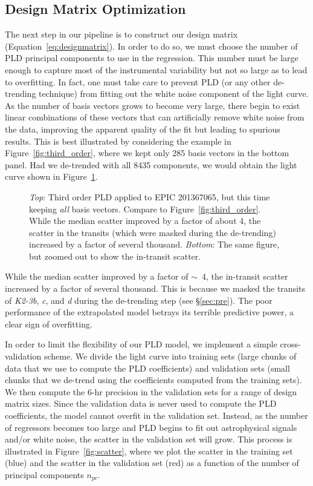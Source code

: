 \documentclass[]{emulateapj}
\begin{document}
\subsection{Design Matrix Optimization}
\label{sec:dmopt}
The next step in our pipeline is to construct our design matrix 
(Equation~\ref{eq:designmatrix}). In order to do so, we must choose the
number of PLD principal components to use in the regression. This number must be
large enough to capture most of the instrumental variability
but not so large as to lead to overfitting. In fact, one must take care
to prevent PLD (or any other de-trending technique) from fitting out the white noise 
component of the light curve. As the number of basis vectors grows to become very large, 
there begin to exist linear combinations of these vectors that can artificially remove 
white noise from the data, improving the apparent quality of the fit but leading to spurious 
results. This is best illustrated by considering the example in Figure~\ref{fig:third_order}, 
where we kept only 285 basis vectors in the bottom panel. Had we de-trended with all 
8435 components, we would obtain the light curve shown in Figure~\ref{fig:overfitting}.
\begin{figure}[h]
  \begin{center}
       \caption{\emph{Top}: Third order PLD applied to EPIC 201367065, but this time keeping 
                \emph{all} basis vectors. Compare to 
                Figure~\ref{fig:third_order}. While the median scatter improved by a factor
                of about 4, the scatter in the transits (which were masked during the de-trending)
                increased by a factor of several thousand. \emph{Bottom}: The same figure, 
                but zoomed out to show the in-transit scatter.}
     \label{fig:overfitting}
  \end{center}
\end{figure}
While the median scatter improved by a factor of $\sim$~4, the in-transit scatter increased
by a factor of several thousand. This is because we masked the transits of \emph{K2-3b},
\emph{c}, and \emph{d} during the de-trending step (see \S\ref{sec:pre}). The poor
performance of the extrapolated model betrays its terrible predictive power, a clear sign
of overfitting.

In order to limit the flexibility of our PLD model, we implement a simple cross-validation
scheme. We divide the light curve into training sets (large chunks of data that we use to compute the PLD
coefficients) and validation sets (small chunks that we de-trend using the coefficients
computed from the training sets). We then compute the 6-hr precision in the validation
sets for a range of design matrix sizes. Since the validation data is never used
to compute the PLD coefficients, the model cannot overfit in the validation set. Instead,
as the number of regressors becomes too large and PLD begins to fit out astrophysical
signals and/or white noise, the scatter in the validation set will grow.
This process is illustrated in Figure~\ref{fig:scatter}, where we plot the scatter in 
the training set (blue) and the scatter in the validation set (red) as a function of
the number of principal components $n_{pc}$.
\end{document}
